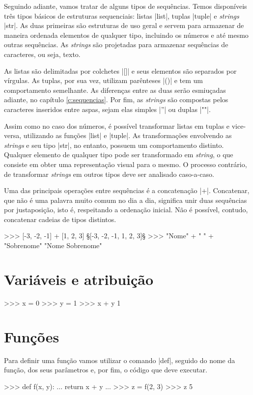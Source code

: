 	Seguindo adiante, vamos tratar de alguns tipos de sequências. Temos disponíveis três tipos básicos de estruturas sequenciais: listas |list|, tuplas |tuple| e \textit{strings} |str|. As duas primeiras são estruturas de uso geral e servem para armazenar de maneira ordenada elementos de qualquer tipo, incluindo os números e até mesmo outras sequências. As \textit{strings} são projetadas para armazenar sequências de caracteres, ou seja, texto. \par

	As listas são delimitadas por colchetes |[]| e seus elementos são separados por vírgulas. As tuplas, por sua vez, utilizam parênteses |()| e tem um comportamento semelhante. As diferenças entre as duas serão esmiuçadas adiante, no capítulo \ref{c:sequencias}. Por fim, as \textit{strings} são compostas pelos caracteres inseridos entre aspas, sejam elas simples |''| ou duplas |""|.\par

	Assim como no caso dos números, é possível transformar listas em tuplas e vice-versa, utilizando as funções |list| e |tuple|. As transformações envolvendo as \textit{strings} e seu tipo |str|, no entanto, possuem um comportamento distinto. Qualquer elemento de qualquer tipo pode ser transformado em \textit{string}, o que consiste em obter uma representação visual para o mesmo. O processo contrário, de transformar \textit{strings} em outros tipos deve ser analisado caso-a-caso. \par

	Uma das principais operações entre sequências é a concatenação |+|. Concatenar, que não é uma palavra muito comum no dia a dia, significa unir duas sequências por justaposição, isto é, respeitando a ordenação inicial. Não é possível, contudo, concatenar cadeias de tipos distintos.\par

	\begin{pyprompt}
	>>> [-3, -2, -1] + [1, 2, 3]
	§[-3, -2, -1, 1, 2, 3]§
	>>> "Nome" + " " + "Sobrenome"
	"Nome Sobrenome"
	\end{pyprompt}
	
	\section*{Variáveis e atribuição}%
	\begin{lstpython}
	>>> x = 0
	>>> y = 1
	>>> x + y
	1
	\end{lstpython}

	\section*{Funções}%
	Para definir uma função vamos utilizar o comando |def|, seguido do nome da função, dos seus parâmetros e, por fim, o código que deve executar.
	\begin{lstpython}
	>>> def f(x, y):
	...		return x + y
	...
	>>> z = f(2, 3)
	>>> z
	5
	\end{lstpython}

